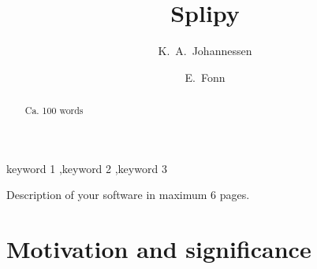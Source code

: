 \documentclass[preprint,12pt, a4paper]{elsarticle}
\begin{document}
\begin{frontmatter}



\title{Splipy}


\author{K.~A.~Johannessen}
\author{E.~Fonn}

\address{SINTEF Digital, PO Box 4760, 7465, Trondheim, Norway}

\begin{abstract}
Ca. 100 words

\end{abstract}

\begin{keyword}
keyword 1 \sep keyword 2 \sep keyword 3



\end{keyword}

\end{frontmatter}

\linenumbers


Description of your software in maximum 6 pages.

\section{Motivation and significance}
\label{}
\end{document}
